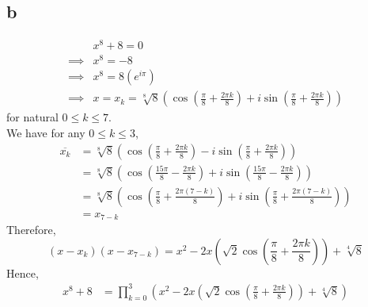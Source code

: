 \documentclass[11pt]{article}
\begin{document}
\subsection*{b}
\begin{equation*}
    \begin{aligned}
         &x^8+8 = 0 \\
        \implies &x^8 = -8 \\
        \implies &x^8 = 8(e^{i\pi}) \\
        \implies &x = x_k = \sqrt[8]{8}\left(\cos\left(\frac{\pi}{8} + \frac{2\pi k}{8}\right) + i \sin \left(\frac{\pi}{8} + \frac{2\pi k}{8}\right)\right)
    \end{aligned}
\end{equation*}
for natural $0\le k \le 7$. \\
We have for any $0\le k \le 3$,
\begin{equation*}
    \begin{aligned}
        \overline{x_k}&=  \sqrt[8]{8}\left(\cos\left(\frac{\pi}{8} + \frac{2\pi k}{8}\right) - i \sin \left(\frac{\pi}{8} + \frac{2\pi k}{8}\right)\right) \\
        &= \sqrt[8]{8} \left(\cos\left(\frac{15\pi}{8} - \frac{2\pi k}{8}\right) + i \sin \left(\frac{15\pi}{8} - \frac{2\pi k}{8}\right)\right) \\
        &= \sqrt[8]{8} \left(\cos\left(\frac{\pi}{8} + \frac{2\pi (7-k)}{8}\right) + i \sin \left(\frac{\pi}{8} + \frac{2\pi (7-k)}{8}\right)\right) \\
        &= x_{7-k}
    \end{aligned}
\end{equation*}
Therefore, 
\[
    (x-x_k)(x-x_{7-k}) = x^2 -2x \left(\sqrt{2}\cos\left(\frac{\pi}{8} + \frac{2\pi k}{8} \right) \right) + \sqrt[4]{8}
\]
Hence, 
\begin{equation*}
    \begin{aligned}
        x^8 +8 &= \prod_{k=0}^3 \left( x^2 -2x \left(\sqrt{2}\cos\left(\frac{\pi}{8} + \frac{2\pi k}{8} \right) \right) + \sqrt[4]{8}\right) \\
    \end{aligned}
\end{equation*}

\newpage
\end{document}
